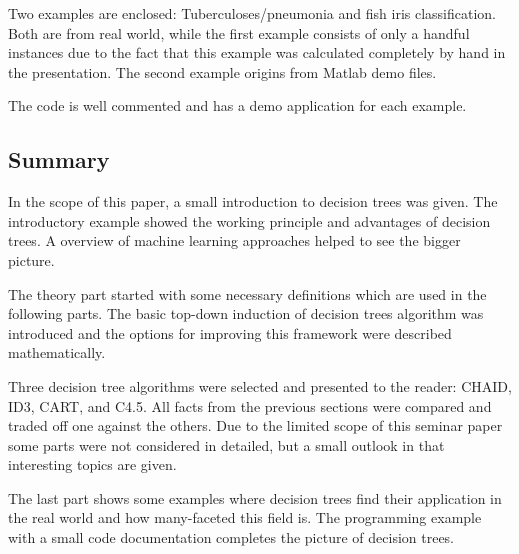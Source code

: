 Two examples are enclosed: Tuberculoses/pneumonia and fish iris classification. Both are from real world, while the first example consists of only a handful instances due to the fact that this example was calculated completely by hand in the presentation. The second example origins from Matlab demo files. 

The code is well commented and has a demo application for each example. 



\subsection{Summary}

In the scope of this paper, a small introduction to decision trees was given. The introductory example showed the working principle and advantages of decision trees. A overview of machine learning approaches helped to see the bigger picture.  

The theory part started with some necessary definitions which are used in the following parts. The basic top-down induction of decision trees algorithm was introduced and the options for improving this framework were described mathematically.

Three decision tree algorithms were selected and presented to the reader: CHAID, ID3, CART, and C4.5. All facts from the previous sections were compared and traded off one against the others. Due to the limited scope of this seminar paper some parts were not considered in detailed, but a small outlook in that interesting topics are given.  

The last part shows some examples where decision trees find their application in the real world and how many-faceted this field is. The programming example with a small code documentation completes the picture of decision trees. 









